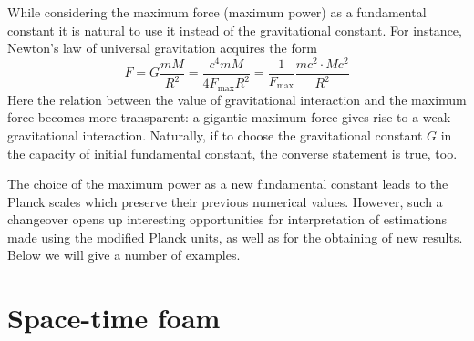\documentclass [12pt]{article}
\begin{document}
While considering the  maximum force (maximum power) as a fundamental constant it is natural to use it instead of the gravitational constant. For instance,  Newton's law of universal gravitation acquires the form
\[F = G\frac{{mM}}{{{R^2}}} = \frac{{{c^4}mM}}{{4{F_{\max }}{R^2}}} = \frac{1}{{{F_{\max }}}}\frac{{m{c^2} \cdot M{c^2}}}{{{R^2}}}\]
Here the relation between the value of gravitational interaction and the maximum force becomes more transparent: a gigantic  maximum force gives rise to  a weak gravitational interaction.  Naturally, if to choose the gravitational constant  $G$ in the capacity of  initial fundamental constant, the converse statement is true, too.

The choice of the maximum power as a new fundamental constant leads to the Planck scales  which preserve their  previous numerical values. However, such a changeover opens up interesting opportunities for interpretation of  estimations made using the modified Planck units, as well as for the obtaining of new results. Below we will give a number of examples.

\section{Space-time foam}
\end{document}
